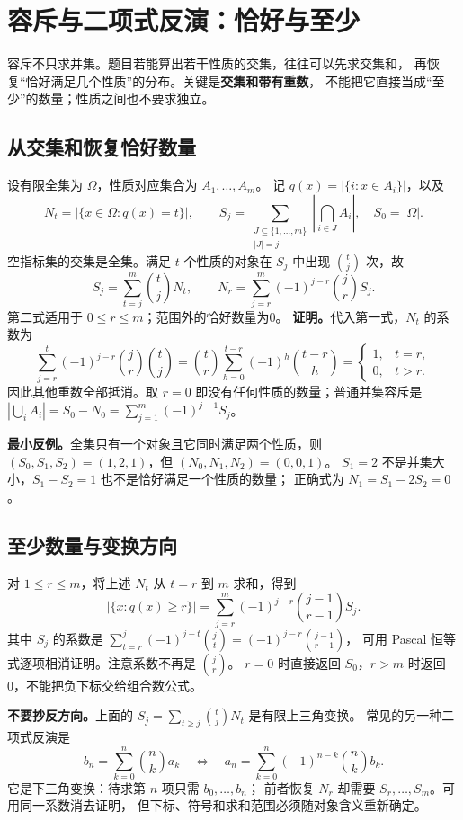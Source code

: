 \section{容斥与二项式反演：恰好与至少}\label{knowledge-inclusion-exact}
容斥不只求并集。题目若能算出若干性质的交集，往往可以先求交集和，
再恢复“恰好满足几个性质”的分布。关键是\textbf{交集和带有重数}，
不能把它直接当成“至少”的数量；性质之间也不要求独立。

\subsection{从交集和恢复恰好数量}
设有限全集为 $\Omega$，性质对应集合为 $A_1,\ldots,A_m$。
记 $q(x)=|\{i:x\in A_i\}|$，以及
\[
N_t=|\{x\in\Omega:q(x)=t\}|,\qquad
S_j=\sum_{\substack{J\subseteq\{1,\ldots,m\}\\|J|=j}}
\left|\bigcap_{i\in J}A_i\right|,\quad S_0=|\Omega|.
\]
空指标集的交集是全集。满足 $t$ 个性质的对象在 $S_j$ 中出现 $\binom tj$ 次，故
\[
\boxed{S_j=\sum_{t=j}^m\binom tjN_t,\qquad
N_r=\sum_{j=r}^m(-1)^{j-r}\binom jrS_j.}
\]
第二式适用于 $0\le r\le m$；范围外的恰好数量为0。
\textbf{证明。}代入第一式，$N_t$ 的系数为
\[
\sum_{j=r}^t(-1)^{j-r}\binom jr\binom tj
=\binom tr\sum_{h=0}^{t-r}(-1)^h\binom{t-r}h
=\begin{cases}1,&t=r,\\0,&t>r.\end{cases}
\]
因此其他重数全部抵消。取 $r=0$ 即没有任何性质的数量；普通并集容斥是
$|\bigcup_iA_i|=S_0-N_0=\sum_{j=1}^m(-1)^{j-1}S_j$。

\textbf{最小反例。}全集只有一个对象且它同时满足两个性质，则
$(S_0,S_1,S_2)=(1,2,1)$，但 $(N_0,N_1,N_2)=(0,0,1)$。
$S_1=2$ 不是并集大小，$S_1-S_2=1$ 也不是恰好满足一个性质的数量；
正确式为 $N_1=S_1-2S_2=0$。

\subsection{至少数量与变换方向}
对 $1\le r\le m$，将上述 $N_t$ 从 $t=r$ 到 $m$ 求和，得到
\[
\boxed{|\{x:q(x)\ge r\}|=
\sum_{j=r}^m(-1)^{j-r}\binom{j-1}{r-1}S_j.}
\]
其中 $S_j$ 的系数是
$\sum_{t=r}^j(-1)^{j-t}\binom jt=(-1)^{j-r}\binom{j-1}{r-1}$，
可用 Pascal 恒等式逐项相消证明。注意系数不再是 $\binom jr$。
$r=0$ 时直接返回 $S_0$，$r>m$ 时返回0，不能把负下标交给组合数公式。

\textbf{不要抄反方向。}上面的 $S_j=\sum_{t\ge j}\binom tjN_t$ 是有限上三角变换。
常见的另一种二项式反演是
\[
b_n=\sum_{k=0}^n\binom nk a_k
\quad\Longleftrightarrow\quad
 a_n=\sum_{k=0}^n(-1)^{n-k}\binom nk b_k.
\]
它是下三角变换：待求第 $n$ 项只需 $b_0,\ldots,b_n$；
前者恢复 $N_r$ 却需要 $S_r,\ldots,S_m$。可用同一系数消去证明，
但下标、符号和求和范围必须随对象含义重新确定。

